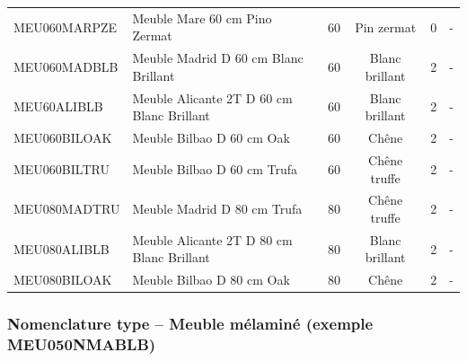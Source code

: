 \documentclass[12pt,a4paper]{article}
\begin{document}
\begin{longtable}{|p{4cm}|p{5cm}|c|c|c|c|}
MEU060MARPZE & Meuble Mare 60 cm Pino Zermat & 60 & Pin zermat & 0 & - \\
MEU060MADBLB & Meuble Madrid D 60 cm Blanc Brillant & 60 & Blanc brillant & 2 & - \\
MEU60ALIBLB & Meuble Alicante 2T D 60 cm Blanc Brillant & 60 & Blanc brillant & 2 & - \\
MEU060BILOAK & Meuble Bilbao D 60 cm Oak & 60 & Chêne & 2 & - \\
MEU060BILTRU & Meuble Bilbao D 60 cm Trufa & 60 & Chêne truffe & 2 & - \\
MEU080MADTRU & Meuble Madrid D 80 cm Trufa & 80 & Chêne truffe & 2 & - \\
MEU080ALIBLB & Meuble Alicante 2T D 80 cm Blanc Brillant & 80 & Blanc brillant & 2 & - \\
MEU080BILOAK & Meuble Bilbao D 80 cm Oak & 80 & Chêne & 2 & - \\
\hline
\end{longtable}

\subsubsection{Nomenclature type – Meuble mélaminé (exemple MEU050NMABLB)}
\end{document}
